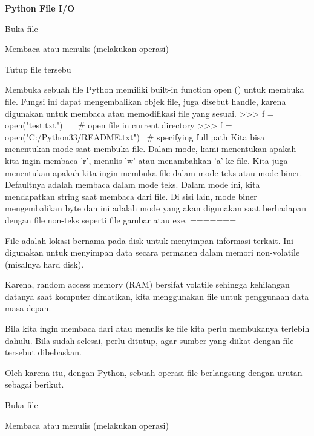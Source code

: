 \begin{center}{\fontsize{24pt}{24pt}\selectfont \textbf{Python File I/O} \\}
\begin{myEnumerate}
\item Buka file 
\item Membaca atau menulis (melakukan operasi) 
\item Tutup file tersebu\end{myEnumerate}

Membuka sebuah file
Python memiliki built-in function open () untuk membuka file. Fungsi ini dapat mengembalikan objek file, juga disebut handle, karena digunakan untuk membaca atau memodifikasi file yang sesuai.
>>> f = open("test.txt")~~~  $  \#  $ open file in current directory
>>> f = open("C:/Python33/README.txt")~  $  \#  $ specifying full path 
Kita bisa menentukan mode saat membuka file. Dalam mode, kami menentukan apakah kita ingin membaca 'r', menulis 'w' atau menambahkan 'a' ke file. Kita juga menentukan apakah kita ingin membuka file dalam mode teks atau mode biner. 
Defaultnya adalah membaca dalam mode teks. Dalam mode ini, kita mendapatkan string saat membaca dari file.
Di sisi lain, mode biner mengembalikan byte dan ini adalah mode yang akan digunakan saat berhadapan dengan file non-teks seperti file gambar atau exe.
=======

File adalah lokasi bernama pada disk untuk menyimpan informasi terkait. Ini digunakan untuk menyimpan data secara permanen dalam memori non-volatile (misalnya hard disk). 

\vspace{12pt}

Karena, random access memory (RAM) bersifat volatile sehingga kehilangan datanya saat komputer dimatikan, kita menggunakan file untuk penggunaan data masa depan. 

\vspace{12pt}

Bila kita ingin membaca dari atau menulis ke file kita perlu membukanya terlebih dahulu. Bila sudah selesai, perlu ditutup, agar sumber yang diikat dengan file tersebut dibebaskan. 

\vspace{12pt}

Oleh karena itu, dengan Python, sebuah operasi file berlangsung dengan urutan sebagai berikut. 
\vspace{12pt}

\begin{myEnumerate}
\item Buka file 

\item Membaca atau menulis (melakukan operasi) 


\end{myEnumerate}
\end{center}
